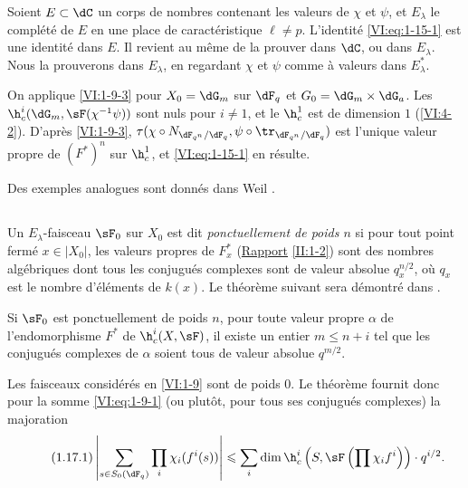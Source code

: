 Soient $E\subset \dC$ un corps de nombres contenant les valeurs de $\chi$ et 
$\psi$, et $E_\lambda$ le complété de $E$ en une place de caractéristique 
$\ell\ne p$. L'identité \eqref{VI:eq:1-15-1} est une identité dans $E$. Il 
revient au même de la prouver dans $\dC$, ou dans $E_\lambda$. Nous la 
prouverons dans $E_\lambda$, en regardant $\chi$ et $\psi$ comme à valeurs 
dans $E_\lambda^\ast$. 

On applique \ref{VI:1-9-3} pour $X_0=\dG_m$ sur $\dF_q$ et 
$G_0=\dG_m\times \dG_a$. Les $\h_c^i(\dG_m,\sF(\chi^{-1}\psi))$ sont nuls pour 
$i\ne 1$, et le $\h_c^1$ est de dimension $1$ (\ref{VI:4-2}). D'après 
\ref{VI:1-9-3}, 
$\tau(\chi\circ N_{\dF_{q^n}/\dF_q},\psi\circ \tr_{\dF_{q^n}/\dF_q})$ est 
l'unique valeur propre de $(F^\ast)^n$ sur $\h_c^1$, et \eqref{VI:eq:1-15-1} en 
résulte. 

Des exemples analogues sont donnés dans Weil . 





\subsection{}\label{VI:1-16}

Un $E_\lambda$-faisceau $\sF_0$ sur $X_0$ est dit \emph{ponctuellement de 
poids $n$} si pour tout point fermé $x\in |X_0|$, les valeurs propres de 
$F_x^\ast$ (\hyperref[II]{Rapport} \ref{II:1-2}) sont des nombres algébriques 
dont tous les conjugués complexes sont de valeur absolue 
$q_x^{n/2}$, où $q_x$ est le nombre d'éléments de $k(x)$. Le théorème 
suivant sera démontré dans . 





\begin{theorem_}\label{VI:1-17}
Si $\sF_0$ est ponctuellement de poids $n$, pour toute valeur propre $\alpha$ 
de l'endomorphisme $F^\ast$ de $\h_c^i(X,\sF)$, il existe un entier 
$m\leqslant n+i$ tel que les conjugués complexes de $\alpha$ soient tous de 
valeur absolue $q^{m/2}$.
\end{theorem_}

Les faisceaux considérés en \ref{VI:1-9} sont de poids $0$. Le théorème 
fournit donc pour la somme \ref{VI:eq:1-9-1} (ou plutôt, pour tous ses 
conjugués complexes) la majoration 
\begin{equation*}\tag{1.17.1}\label{VI:eq:1-17-1}
  \left|\sum_{s\in S_0(\dF_q)} \prod_i \chi_i(f^i(s)) \right| \leqslant \sum_i \dim \h_c^i\left(S,\sF\left(\prod \chi_i f^i\right)\right)\cdot q^{i/2} \text{.}
\end{equation*}





